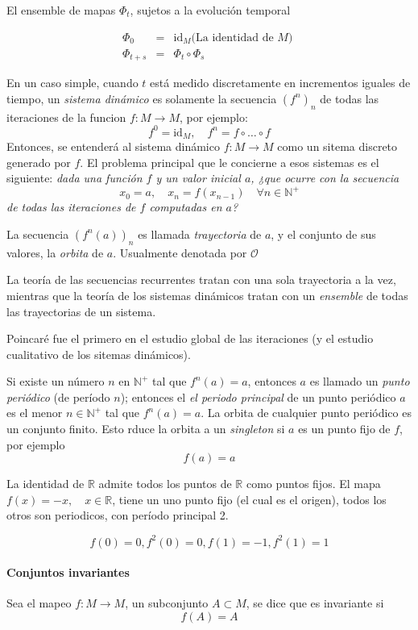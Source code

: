 \documentclass[12pt]{book}
\newcommand{\R}{\ensuremath{\mathbb{R}} }
\begin{document}
El ensemble de mapas $\Phi_t$, sujetos a la evolución temporal

\begin{eqnarray}
	\Phi_0 &=& \text{id}_M \text{(La identidad de $M$) } \\
	\Phi_{t+s} &=& \Phi_t \circ \Phi_s
\end{eqnarray}

En un caso simple, cuando $t$ está medido discretamente en incrementos iguales
de tiempo, un \textit{sistema dinámico} es solamente la secuencia $(f^n)_n$ de
todas las iteraciones de la funcion $f: M \rightarrow M$, por ejemplo:
$$
	f^0 = \text{id}_M, \quad f^n = f \circ \ldots \circ f
$$
\newcommand{\ra}{\rightarrow}
Entonces, se entenderá al sistema dinámico $f: M \rightarrow M$ como un sitema discreto
generado por $f$.  El problema principal que le concierne a esos sistemas es el
siguiente: \textit{dada una función $f$ y un valor inicial $a$, ¿que ocurre con
la secuencia}
$$
	x_0 = a, \quad x_n = f(x_{n-1}) \quad \forall n \in \mathbb{N}^+
$$
\textit{de todas las iteraciones de $f$ computadas en $a$?}

\newcommand{\ti}{\textit}
\newcommand{\bigO}{\mathcal{O}}
La secuencia $(f^n(a))_n$ es llamada \textit{trayectoria} de $a$, y el conjunto
de sus valores, la \ti{orbita} de $a$. Usualmente denotada por $\bigO$

La teoría de las secuencias recurrentes tratan con una sola trayectoria a la
vez, mientras que la teoría de los sistemas dinámicos tratan con un
\ti{ensemble} de todas las trayectorias de un sistema.

Poincaré fue el primero en el estudio global de las iteraciones (y el estudio
cualitativo de los sitemas dinámicos).

Si existe un número $n$ en $\mathbb{N}^+$ tal que $f^n(a) = a$, entonces $a$ es
llamado un \ti{punto periódico} (de período $n$); entonces el \ti{el periodo
principal} de un punto periódico $a$ es el menor $n \in \mathbb{N}^+$ tal que 
$f^n(a) = a$. La orbita de cualquier punto periódico es un conjunto finito. Esto
rduce la orbita a un \ti{singleton} si $a$ es un punto fijo de $f$, por ejemplo 
$$
	f(a) = a
$$

La identidad de \R admite todos los puntos de \R como puntos fijos. El mapa
$f(x) = -x, \quad x \in \R$, tiene un uno punto fijo (el cual es el origen),
todos los otros son periodicos, con período principal 2.

$$
	f(0)=0, f^2(0)=0, f(1) = -1, f^2(1)=1
$$
\paragraph{Conjuntos invariantes} Sea el mapeo $f: M \ra M $, un subconjunto $A
\subset M$, se dice que es invariante si
$$
	f(A) = A
$$
\end{document}
